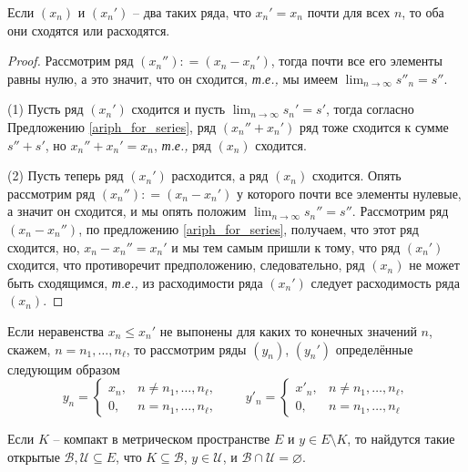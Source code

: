 \begin{lemma}
    Если $(x_n)$ и $(x_n')$ -- два таких ряда, что $x_n' = x_n$ почти для всех $n$, то оба они сходятся или расходятся.
\end{lemma}
\begin{proof}
    Рассмотрим ряд $(x_n''): = (x_n - x_n')$, тогда почти все его элементы равны нулю, а это значит, что он сходится, \textit{т.е.,} мы имеем $ \lim_{n \to \infty} s''_n = s''$. 

(1) Пусть ряд $(x_n')$ сходится и пусть $\lim_{n \to \infty}s_n' =s'$, тогда согласно Предложению \ref{ariph_for_series}, ряд $(x_n'' + x_n')$ ряд тоже сходится к сумме $s''+s'$, но $x_n''+x_n' = x_n$, \textit{т.е.,} ряд $(x_n)$ сходится.

(2) Пусть теперь ряд $(x_n')$ расходится, а ряд $(x_n)$ сходится. Опять рассмотрим ряд $(x_n''): = (x_n - x_n')$ у которого почти все элементы нулевые, а значит он сходится, и мы опять положим $\lim_{n \to \infty}s_n'' = s''.$ Рассмотрим ряд $(x_n - x_n'')$, по предложению \ref{ariph_for_series}, получаем, что этот ряд сходится, но, $x_n - x_n'' = x_n'$ и мы тем самым пришли к тому, что ряд $(x_n')$ сходится, что противоречит предположению, следовательно, ряд $(x_n)$ не может быть сходящимся, \textit{т.е.,} из расходимости ряда $(x_n')$ следует расходимость ряда $(x_n).$
\end{proof}


 
 Если неравенства $x_n\le x_n'$ не выпонены для каких то конечных значений $n$, скажем, $n = n_1,\ldots, n_\ell$, то рассмотрим ряды $(y_n)$, $(y_n')$ определённые следующим образом 
\[
 y_n = \begin{cases}
     x_n, & n \ne n_1,\ldots, n_\ell,\\
     0, & n = n_1,\ldots, n_\ell,
 \end{cases} \qquad  y'_n = \begin{cases}
     x'_n, & n \ne n_1,\ldots, n_\ell,\\
     0, & n = n_1,\ldots, n_\ell
 \end{cases} 
\]


\begin{proposition}\label{for_compact}
    Если $K$ -- компакт в метрическом пространстве $E$ и $y \in E \setminus K$, то найдутся такие открытые $\mathscr{B}, \mathscr{U} \subseteq E$, что $K \subseteq \mathscr{B}$, $y \in \mathscr{U}$, и $\mathscr{B}\cap \mathscr{U} = \varnothing.$ 
\end{proposition}

